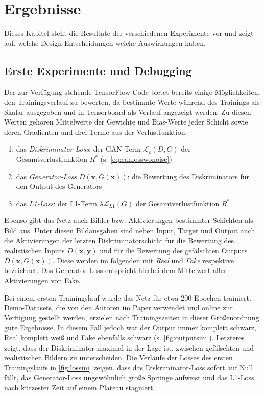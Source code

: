 \chapter{Ergebnisse}

Dieses Kapitel stellt die Resultate der verschiedenen Experimente vor und zeigt auf, welche Design-Entscheidungen welche Auswirkungen haben.



\section{Erste Experimente und Debugging}

Der zur Verfügung stehende TensorFlow-Code bietet bereits einige Möglichkeiten, den Trainingsverlauf zu bewerten, da bestimmte Werte während des Trainings als Skalar ausgegeben und in Tensorboard als Verlauf angezeigt werden.
Zu diesen Werten gehören Mittelwerte der Gewichte und Bias-Werte jeder Schicht sowie deren Gradienten und drei Terme aus der Verlustfunktion:

\begin{enumerate}
	\item das \emph{Diskriminator-Loss}: der GAN-Term $ \mathcal{L}_c(D, G) $ der Gesamtverlustfunktion $ R^* $ (s. \autoref{eq:canlosswonoise})
	\item das \emph{Generator-Loss} $ D(\mathbf{x}, G(\mathbf{x})) $: die Bewertung des Diskriminators für den Output des Generators
	\item das \emph{L1-Loss}: der L1-Term $ \lambda \mathcal{L}_{L1}(G) $ der Gesamtverlustfunktion $ R^* $
\end{enumerate}

Ebenso gibt das Netz auch Bilder bzw. Aktivierungen bestimmter Schichten als Bild aus.
Unter diesen Bildausgaben sind neben Input, Target und Output auch die Aktivierungen der letzten Diskriminatorschicht für die Bewertung des realistischen Inputs $ D(\mathbf{x}, \mathbf{y}) $ und für die Bewertung des gefälschten Outputs $ D(\mathbf{x}, G(\mathbf{x})) $.
Diese werden im folgenden mit \emph{Real} und \emph{Fake} respektive bezeichnet.
Das Generator-Loss entspricht hierbei dem Mittelwert aller Aktivierungen von Fake.

Bei einem ersten Trainingslauf wurde das Netz für etwa 200 Epochen trainiert.
Demo-Datasets, die von den Autoren im Paper verwendet und online zur Verfügung gestellt werden, erzielen nach Trainingszeiten in dieser Größenordnung gute Ergebnisse.
In diesem Fall jedoch war der Output immer komplett schwarz, Real komplett weiß und Fake ebenfalls schwarz (s. \autoref{fig:outputsini}).
Letzteres zeigt, dass der Diskriminator maximal in der Lage ist, zwischen gefälschten und realistischen Bildern zu unterscheiden.
Die Verläufe der Losses des ersten Trainingslaufs in \autoref{fig:lossini} zeigen, dass das Diskriminator-Loss sofort auf Null fällt, das Generator-Loss ungewöhnlich große Sprünge aufweist und das L1-Loss nach kürzester Zeit auf einem Plateau stagniert.

